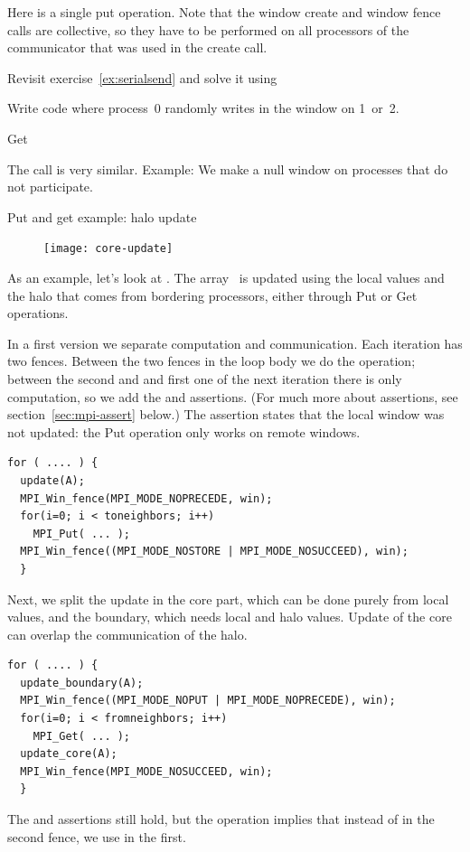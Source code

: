 Here is a single put operation. Note that the window create and window fence calls
are collective, so they have to be performed on all processors
of the communicator that was used in the create call.

\begin{exercise}
  \label{ex:rightput}
  Revisit exercise~\ref{ex:serialsend} and solve it using
\end{exercise}

\begin{exercise}
  \label{ex:randomput}
  Write code where process~0 randomly writes in the window on 1~or~2.
\end{exercise}

 {Get}

The  call is very similar.
%
%
Example:
%
%
We make a null window on processes that do not participate.
%

 {Put and get example: halo update}

\begin{figure}
  \texttt{[image: core-update]}
\end{figure}
%
As an example, let's look at .
The array~ is updated using the local values and the halo
that comes from bordering processors, either through Put or Get operations.

In a first version we separate computation and communication.
Each iteration has two fences. Between the two fences in the loop body
we do the  operation; between the second and and first one
of the next iteration there is only computation, so we add the
 and  assertions. (For much more about
assertions, see section~\ref{sec:mpi-assert} below.)
The  assertion
states that the local window was not updated: the Put operation only
works on remote windows.
\begin{lstlisting}
for ( .... ) {
  update(A); 
  MPI_Win_fence(MPI_MODE_NOPRECEDE, win); 
  for(i=0; i < toneighbors; i++) 
    MPI_Put( ... );
  MPI_Win_fence((MPI_MODE_NOSTORE | MPI_MODE_NOSUCCEED), win); 
  }
\end{lstlisting}

Next, we split the update in the core part, which can be done purely
from local values, and the boundary, which needs local and halo
values. Update of the core can overlap the communication of the halo.
\begin{lstlisting}
for ( .... ) {
  update_boundary(A); 
  MPI_Win_fence((MPI_MODE_NOPUT | MPI_MODE_NOPRECEDE), win); 
  for(i=0; i < fromneighbors; i++) 
    MPI_Get( ... );
  update_core(A); 
  MPI_Win_fence(MPI_MODE_NOSUCCEED, win); 
  }
\end{lstlisting}
The  and  assertions still hold, but the
 operation implies that instead of  in the
second fence, we use  in the first.

